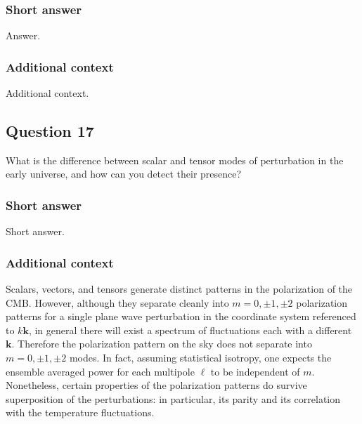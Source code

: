 \documentclass[a4paper,11pt]{article}
\begin{document}
\subsubsection{Short answer}

Answer.

\subsubsection{Additional context}

Additional context.

%
%

\newpage
\subsection{Question 17}

What is the difference between scalar and tensor modes of perturbation in the early universe, and how can you detect their presence?

\subsubsection{Short answer}

Short answer.

\subsubsection{Additional context}

{\noindent}Scalars, vectors, and tensors generate distinct patterns in the polarization of the CMB. However, although they separate cleanly into $m=0,\pm1,\pm2$ polarization patterns for a single plane wave perturbation in the coordinate system referenced to $k\bm{k}$, in general there will exist a spectrum of fluctuations each with a different $\bm{k}$. Therefore the polarization pattern on the sky does not separate into $m=0,\pm1,\pm2$ modes. In fact, assuming statistical isotropy, one expects the ensemble averaged power for each multipole $\ell$ to be independent of $m$. Nonetheless, certain properties of the polarization patterns do survive superposition of the perturbations: in particular, its parity and its correlation with the temperature fluctuations.
\end{document}
